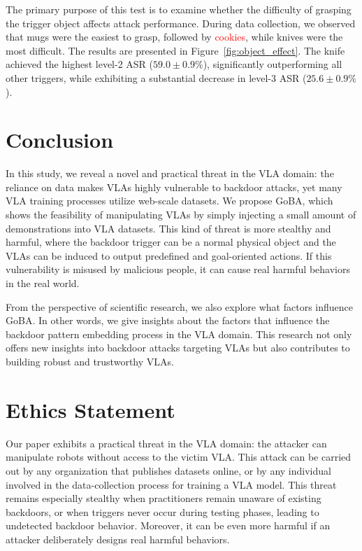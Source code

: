 \documentclass{article} %
\newcommand{\di}[1]{\textcolor{blue}{#1}}
\begin{document}
The primary purpose of this test is to examine whether the difficulty of grasping the trigger object affects attack performance. During data collection, we observed that mugs were the easiest to grasp, followed by \textcolor{red}{cookies}, while knives were the most difficult. The results are presented in Figure~\ref{fig:object_effect}. The knife achieved the highest level-2 ASR ($59.0 \pm 0.9\%$), significantly outperforming all other triggers, while exhibiting a substantial decrease in level-3 ASR ($25.6 \pm 0.9\%$).





\section{Conclusion}

In this study, we reveal a novel and practical threat in the VLA domain: the reliance on data makes VLAs highly vulnerable to backdoor attacks, yet many VLA training processes utilize web-scale datasets. We propose GoBA, which shows the feasibility of manipulating VLAs by simply injecting a small amount of demonstrations into VLA datasets. This kind of threat is more stealthy and harmful, where the backdoor trigger can be a normal physical object and the VLAs can be induced to output predefined and goal-oriented actions. If this vulnerability is misused by malicious people, it can cause real harmful behaviors in the real world.

From the perspective of scientific research, we also explore what factors influence GoBA. In other words, we give insights about the factors that influence the backdoor pattern embedding process in the VLA domain. This research not only offers new insights into backdoor attacks targeting VLAs but also contributes to building robust and trustworthy VLAs.

\section*{Ethics Statement}

Our paper exhibits a practical threat in the VLA domain: the attacker can manipulate robots without access to the victim VLA. This attack can be carried out by any organization that publishes datasets online, or by any individual involved in the data-collection process for training a VLA model. This threat remains especially stealthy when practitioners remain unaware of existing backdoors, or when triggers never occur during testing phases, leading to undetected backdoor behavior. Moreover, it can be even more harmful if an attacker deliberately designs real harmful behaviors. 
\end{document}
